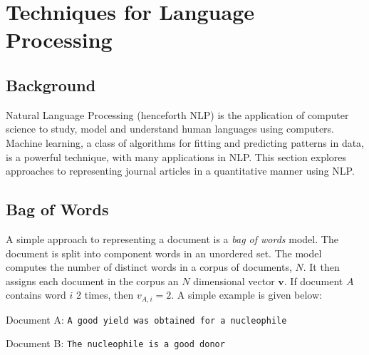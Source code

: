 \chapter{Techniques for Language Processing}
\label{chapt:NLP}
\section{Background}
Natural Language Processing (henceforth NLP) is the application of computer science to study, model and understand human languages using computers. Machine learning, a class of algorithms for fitting and predicting patterns in data, is a powerful technique, with many applications in NLP. This section explores approaches to representing journal articles in a quantitative manner using NLP.
\section{Bag of Words}
A simple approach to representing a document is a \emph{bag of words} model. The document is split into component words in an unordered set. The model computes the number of distinct words in a corpus of documents, $N$. It then assigns each document in the corpus an $N$ dimensional vector $\mathbf{v}$. If document $A$ contains word $i$ 2 times, then $v_{A, i } = 2$. A simple example is given below:

Document A: \texttt{A good yield was obtained for a nucleophile}

Document B: \texttt{The nucleophile is a good donor}

